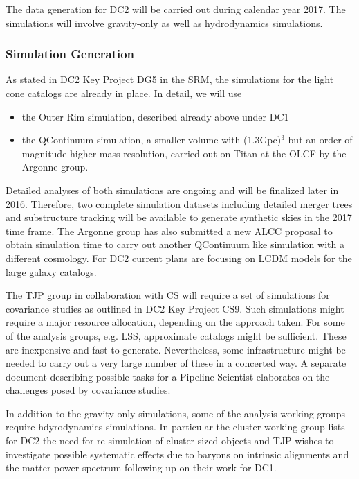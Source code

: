 The data generation for DC2 will be carried out during calendar year 2017. The simulations will involve gravity-only as well as hydrodynamics simulations.

\subsubsection{Simulation Generation}
\label{sec:keysims:dc2:simgen}

As stated in DC2 Key Project DG5 in the SRM, the simulations for the light cone catalogs are already in place. In detail, we will use
\begin{itemize}
\item the Outer Rim simulation, described already above under DC1
\item the QContinuum simulation, a smaller volume with (1.3Gpc)$^3$ but an order of magnitude higher mass resolution, carried out on Titan at the OLCF by the Argonne group. 
\end{itemize}
Detailed analyses of both simulations are ongoing and will be finalized later in 2016. Therefore, two complete simulation datasets including detailed merger trees and substructure tracking will be available to generate synthetic skies in the 2017 time frame. The Argonne group has also submitted a new ALCC proposal to obtain simulation time to carry out another QContinuum like simulation with a different cosmology. For DC2 current plans are focusing on LCDM models for the large galaxy catalogs.

The TJP group in collaboration with CS will require a set of simulations for covariance studies as outlined in DC2 Key Project CS9. Such simulations might require a major resource allocation, depending on the approach taken. For some of the analysis groups, e.g. LSS, approximate catalogs might be sufficient. These are inexpensive and fast to generate. Nevertheless, some infrastructure might be needed to carry out a very large number of these in a concerted way. A separate document describing possible tasks for a Pipeline Scientist elaborates on the challenges posed by covariance studies. 

In addition to the gravity-only simulations, some of the analysis working groups require hdyrodynamics simulations. In particular the cluster working group lists for DC2 the need for re-simulation of cluster-sized objects and TJP wishes to investigate possible systematic effects due to baryons on intrinsic alignments and the matter power spectrum following up on their work for DC1.

